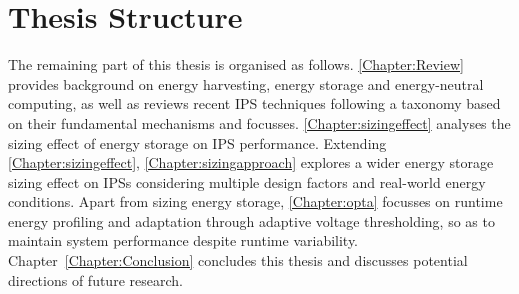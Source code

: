 \section{Thesis Structure}

The remaining part of this thesis is organised as follows. 
\cref{Chapter:Review} provides background on energy harvesting, energy storage and energy-neutral computing, as well as reviews recent IPS techniques following a taxonomy based on their fundamental mechanisms and focusses.
\cref{Chapter:sizingeffect} analyses the sizing effect of energy storage on IPS performance.
Extending \cref{Chapter:sizingeffect}, \cref{Chapter:sizingapproach} explores a wider energy storage sizing effect on IPSs considering multiple design factors and real-world energy conditions. 
Apart from sizing energy storage, \cref{Chapter:opta} focusses on runtime energy profiling and adaptation through adaptive voltage thresholding, so as to maintain system performance despite runtime variability.
Chapter~\ref{Chapter:Conclusion} concludes this thesis and discusses potential directions of future research. 